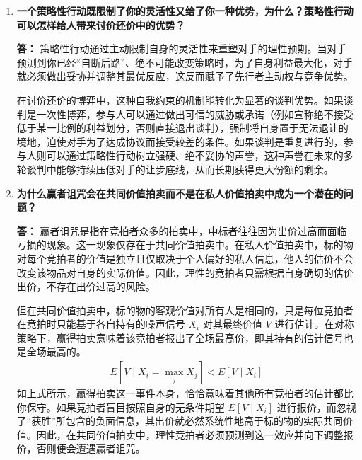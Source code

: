\begin{enumerate}[label=\textbf{\arabic*.}, leftmargin=*]
		为了使威胁可信，在位厂商必须采取策略性行动，事先改变自身的支付函数或限制自身的选择。一种行动是提前扩大生产能力。这种资本投入作为沉没成本，降低了在位厂商后续扩大产出的边际成本，使得新厂商进入时，在位厂商维持高产出并进行价格战成为其事后的最优选择。另一种行动是刻意树立一种好斗或不理性的声誉。这种声誉通过增加市场环境的不确定性，显著降低了潜在进入者的预期利润。这两种行动虽然牺牲了当前利润，但通过将威胁转化为可信承诺，成功吓退了潜在进入者，从而保障了长远利润。
		
		\item \textbf{一个策略性行动既限制了你的灵活性又给了你一种优势，为什么？策略性行动可以怎样给人带来讨价还价中的优势？}
		
		\textbf{答：}
		策略性行动通过主动限制自身的灵活性来重塑对手的理性预期。当对手预测到你已经“自断后路”、绝不可能改变策略时，为了自身利益最大化，对手就必须做出妥协并调整其最优反应，这反而赋予了先行者主动权与竞争优势。
		
		在讨价还价的博弈中，这种自我约束的机制能转化为显著的谈判优势。如果谈判是一次性博弈，参与人可以通过做出可信的威胁或承诺（例如宣称绝不接受低于某一比例的利益划分，否则直接退出谈判），强制将自身置于无法退让的境地，迫使对手为了达成协议而接受较差的条件。如果谈判是重复进行的，参与人则可以通过策略性行动树立强硬、绝不妥协的声誉，这种声誉在未来的多轮谈判中能够持续压低对手的让步底线，从而长期获得更大份额的剩余。
		
		\item \textbf{为什么赢者诅咒会在共同价值拍卖而不是在私人价值拍卖中成为一个潜在的问题？}
		
		\textbf{答：}
		赢者诅咒是指在竞拍者众多的拍卖中，中标者往往因为出价过高而面临亏损的现象。这一现象仅存在于共同价值拍卖中。在私人价值拍卖中，标的物对每个竞拍者的价值是独立且仅取决于个人偏好的私人信息，他人的估价不会改变该物品对自身的实际价值。因此，理性的竞拍者只需根据自身确切的估价出价，不存在出价过高的风险。
		
		但在共同价值拍卖中，标的物的客观价值对所有人是相同的，只是每位竞拍者在竞拍时只能基于各自持有的噪声信号 $X_i$ 对其最终价值 $V$ 进行估计。在对称策略下，赢得拍卖意味着该竞拍者报出了全场最高价，即其持有的估计信号也是全场最高的。
		\[
		\begin{aligned}
			E[V \mid X_i = \max_{j} X_j] < E[V \mid X_i]
		\end{aligned}
		\]
		如上式所示，赢得拍卖这一事件本身，恰恰意味着其他所有竞拍者的估计都比你保守。如果竞拍者盲目按照自身的无条件期望 $E[V \mid X_i]$ 进行报价，而忽视了“获胜”所包含的负面信息，其出价就必然系统性地高于标的物的实际共同价值。因此，在共同价值拍卖中，理性竞拍者必须预测到这一效应并向下调整报价，否则便会遭遇赢者诅咒。
		\newpage
	\end{enumerate}
